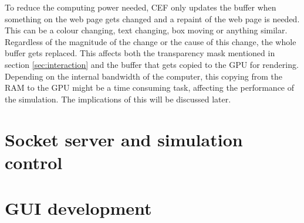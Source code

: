 To reduce the computing power needed, CEF only updates the buffer when something on the web page gets changed and a repaint of the web page is needed. This can be a colour changing, text changing, box moving or anything similar. Regardless of the magnitude of the change or the cause of this change, the whole buffer gets replaced. This affects both the transparency mask mentioned in section \ref{sec:interaction} and the buffer that gets copied to the GPU for rendering. Depending on the internal bandwidth of the computer, this copying from the RAM to the GPU might be a time consuming task, affecting the performance of the simulation. The implications of this will be discussed later. 

\section{Socket server and simulation control}
\section{GUI development}
